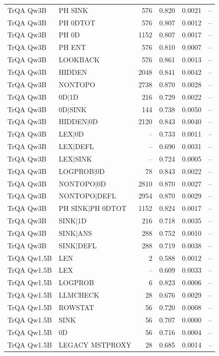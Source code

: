 \begin{longtable}{llrrrr}
TrQA Qw3B & PH SINK & 576 & 0.820 & 0.0021 & -- \\
TrQA Qw3B & PH 0DTOT & 576 & 0.807 & 0.0012 & -- \\
TrQA Qw3B & PH 0D & 1152 & 0.807 & 0.0017 & -- \\
TrQA Qw3B & PH ENT & 576 & 0.810 & 0.0007 & -- \\
TrQA Qw3B & LOOKBACK & 576 & 0.861 & 0.0013 & -- \\
TrQA Qw3B & HIDDEN & 2048 & 0.841 & 0.0042 & -- \\
TrQA Qw3B & NONTOPO & 2738 & 0.870 & 0.0028 & -- \\
TrQA Qw3B & 0D$\mid$1D & 216 & 0.729 & 0.0022 & -- \\
TrQA Qw3B & 0D$\mid$SINK & 144 & 0.738 & 0.0050 & -- \\
TrQA Qw3B & HIDDEN$\mid$0D & 2120 & 0.843 & 0.0040 & -- \\
TrQA Qw3B & LEX$\mid$0D & -- & 0.733 & 0.0011 & -- \\
TrQA Qw3B & LEX$\mid$DEFL & -- & 0.690 & 0.0031 & -- \\
TrQA Qw3B & LEX$\mid$SINK & -- & 0.724 & 0.0005 & -- \\
TrQA Qw3B & LOGPROB$\mid$0D & 78 & 0.843 & 0.0022 & -- \\
TrQA Qw3B & NONTOPO$\mid$0D & 2810 & 0.870 & 0.0027 & -- \\
TrQA Qw3B & NONTOPO$\mid$DEFL & 2954 & 0.870 & 0.0029 & -- \\
TrQA Qw3B & PH SINK$\mid$PH 0DTOT & 1152 & 0.824 & 0.0017 & -- \\
TrQA Qw3B & SINK$\mid$1D & 216 & 0.718 & 0.0035 & -- \\
TrQA Qw3B & SINK$\mid$ANS & 288 & 0.752 & 0.0010 & -- \\
TrQA Qw3B & SINK$\mid$DEFL & 288 & 0.719 & 0.0038 & -- \\
TrQA Qw1.5B & LEN & 2 & 0.588 & 0.0012 & -- \\
TrQA Qw1.5B & LEX & -- & 0.609 & 0.0033 & -- \\
TrQA Qw1.5B & LOGPROB & 6 & 0.823 & 0.0006 & -- \\
TrQA Qw1.5B & LLMCHECK & 28 & 0.676 & 0.0029 & -- \\
TrQA Qw1.5B & ROWSTAT & 56 & 0.720 & 0.0008 & -- \\
TrQA Qw1.5B & SINK & 56 & 0.707 & 0.0000 & -- \\
TrQA Qw1.5B & 0D & 56 & 0.716 & 0.0004 & -- \\
TrQA Qw1.5B & LEGACY MSTPROXY & 28 & 0.685 & 0.0014 & -- \\

\end{longtable}
